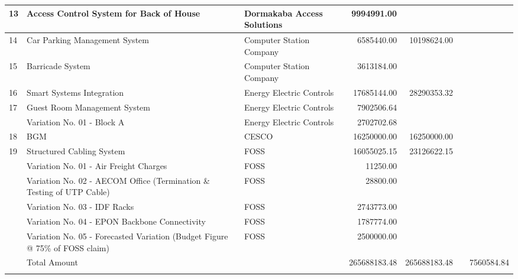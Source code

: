 \begin{longtable}[c]{|l|%
                  >{\RaggedRight}p{3.5cm}|%
                  >{\RaggedRight}p{3.5cm}|%
                  r|r %
                  |c|r|}
\rowcolor{thetableheadbgcolor!0.25!white} 13  & Access Control System for Back of House   & Dormakaba Access Solutions   & \num{9994991.00}   &    &    &    \\
\hline
\rowcolor{thetableheadbgcolor!0.25!white} 14  & Car Parking Management System   & Computer Station Company   & \num{6585440.00}   & \num{10198624.00}   &    &    \\
\rowcolor{thetableheadbgcolor!0.25!white} 15  & Barricade System   & Computer Station Company   & \num{3613184.00}   &    &    &    \\
\hline
\rowcolor{thetableheadbgcolor!0.25!white} 16  & Smart  Systems Integration   & Energy Electric Controls   & \num{17685144.00}   & \num{28290353.32}   &    &    \\
\rowcolor{thetableheadbgcolor!0.25!white} 17  & Guest Room Management System   & Energy Electric Controls   & \num{7902506.64}   &    &    &    \\
\rowcolor{thetableheadbgcolor!0.25!white}   & Variation No. 01 - Block A   & Energy Electric Controls   & \num{2702702.68}   &    &    &    \\
\hline
\rowcolor{thetableheadbgcolor!0.25!white} 18  & BGM   & CESCO   & \num{16250000.00}   & \num{16250000.00}   &    &    \\
\hline
\rowcolor{thetableheadbgcolor!0.25!white} 19  & Structured Cabling System   & FOSS   & \num{16055025.15}   & \num{23126622.15}   &    &    \\
\rowcolor{thetableheadbgcolor!0.25!white}   & Variation No. 01 - Air Freight Charges   & FOSS   & \num{11250.00}   &    &    &    \\
\rowcolor{thetableheadbgcolor!0.25!white}   & Variation No. 02 - AECOM Office (Termination \& Testing of UTP Cable)   & FOSS   & \num{28800.00}   &    &    &    \\
\rowcolor{thetableheadbgcolor!0.25!white}   & Variation No. 03 - IDF Racks   & FOSS   & \num{2743773.00}   &    &    &    \\
\rowcolor{thetableheadbgcolor!0.25!white}   & Variation No. 04 - EPON Backbone Connectivity   & FOSS   & \num{1787774.00}   &    &    &    \\
\rowcolor{thetableheadbgcolor!0.25!white}   & Variation No. 05 - Forecasted Variation (Budget Figure @ 75\% of FOSS claim)   & FOSS   & \num{2500000.00}   &    &    &    \\
\hline
\rowcolor{thetableheadbgcolor!0.25!white}   & Total Amount   &    & \num{265688183.48}   & \num{265688183.48}   &    & \num{7560584.84}   \\
\hline
\addlinespace[0pt] 
\bottomrule
\end{longtable}
\egroup
